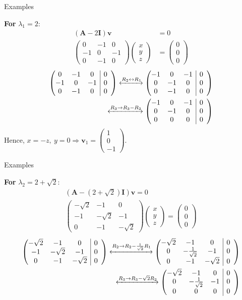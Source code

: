 \documentclass{beamer}
\makeatletter
\numberwithin{equation}{section}
\theoremstyle{remark}
\newcommand{\myvec}[1]{\ensuremath{\begin{pmatrix}#1\end{pmatrix}}}
\newenvironment{amatrix}[1]{%
  \left(\begin{array}{@{}*{#1}{c}|*{#1}{c}@{}}
}{%
  \end{array}\right)
}
\newcommand{\myaugvec}[2]{\ensuremath{\begin{amatrix}{#1}#2\end{amatrix}}}
\let\vec\mathbf
\makeatother
\begin{document}
\begin{frame}{Examples}

\textbf{For } $\lambda_1 = 2$:
\begin{align}
(\vec{A}-2\vec{I})\vec{v} &= 0\\
\myvec{0 & -1 & 0\\ -1 & 0 & -1\\ 0 & -1 & 0}\myvec{x\\y\\z} &= \myvec{0\\0\\0}
\end{align}
\begin{align}
\myaugvec{3}{0 & -1 & 0 & 0\\ -1 & 0 & -1 & 0\\ 0 & -1 & 0 & 0}
\xleftrightarrow{R_2 \leftrightarrow R_1}
\myaugvec{3}{-1 & 0 & -1 & 0\\ 0 & -1 & 0 & 0\\ 0 & -1 & 0 & 0}\\
\xleftrightarrow{R_3 \to R_3 - R_2}
\myaugvec{3}{-1 & 0 & -1 & 0\\ 0 & -1 & 0 & 0\\ 0 & 0 & 0 & 0}
\end{align}
Hence, $x = -z,\ y = 0 \Rightarrow \vec{v}_1 = \myvec{1\\0\\-1}$.

\end{frame}

\begin{frame}{Examples}

\textbf{For } $\lambda_2 = 2+\sqrt{2}$:
\begin{align}
(\vec{A}-(2+\sqrt{2})\vec{I})\vec{v}=0\\
\myvec{-\sqrt{2} & -1 & 0\\ -1 & -\sqrt{2} & -1\\ 0 & -1 & -\sqrt{2}}\myvec{x\\y\\z} = \myvec{0\\0\\0}
\end{align}
\begin{align}
\myaugvec{3}{-\sqrt{2} & -1 & 0 & 0\\ -1 & -\sqrt{2} & -1 & 0\\ 0 & -1 & -\sqrt{2} & 0}
\xleftrightarrow{R_2 \to R_2 - \frac{1}{\sqrt{2}}R_1}
\myaugvec{3}{-\sqrt{2} & -1 & 0 & 0\\ 0 & -\frac{1}{\sqrt{2}} & -1 & 0\\ 0 & -1 & -\sqrt{2} & 0}\\
\xleftrightarrow{R_3 \to R_3 -\sqrt{2}R_2}
\myaugvec{3}{-\sqrt{2} & -1 & 0 & 0\\ 0 & -\frac{1}{\sqrt{2}} & -1 & 0\\ 0 & 0 & 0 & 0}
\end{align}

\end{frame}
\end{document}
